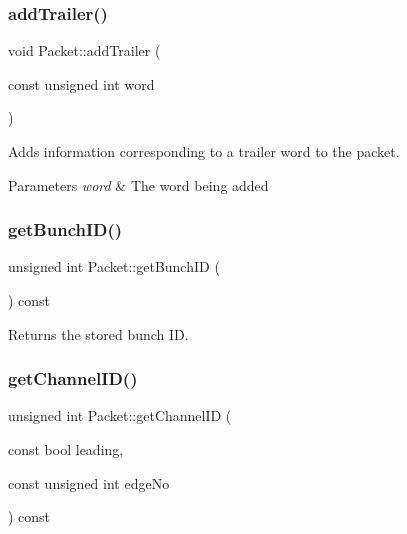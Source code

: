 \subsubsection{\texorpdfstring{add\+Trailer()}{addTrailer()}}
{\footnotesize\ttfamily void Packet\+::add\+Trailer (\begin{DoxyParamCaption}\item[{const unsigned int}]{word }\end{DoxyParamCaption})}



Adds information corresponding to a trailer word to the packet. 


\begin{DoxyParams}{Parameters}
{\em word} & The word being added \\
\hline
\end{DoxyParams}
\mbox{\label{class_packet_a3965d1b3a0e88e2af7cd1bd5ca97e009}} 
\subsubsection{\texorpdfstring{get\+Bunch\+I\+D()}{getBunchID()}}
{\footnotesize\ttfamily unsigned int Packet\+::get\+Bunch\+ID (\begin{DoxyParamCaption}{ }\end{DoxyParamCaption}) const\hspace{0.3cm}{\ttfamily [inline]}}



Returns the stored bunch ID. 

\mbox{\label{class_packet_a8a767973ff4b30b417716bbb071ccf33}} 
\subsubsection{\texorpdfstring{get\+Channel\+I\+D()}{getChannelID()}}
{\footnotesize\ttfamily unsigned int Packet\+::get\+Channel\+ID (\begin{DoxyParamCaption}\item[{const bool}]{leading,  }\item[{const unsigned int}]{edge\+No }\end{DoxyParamCaption}) const}



